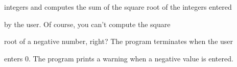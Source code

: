 integers and computes the sum of the square root of the integers entered

by the user. Of course, you can't compute the square

root of a negative number, right? The program terminates when the user

enters 0. The program prints a warning when a negative value is entered.

